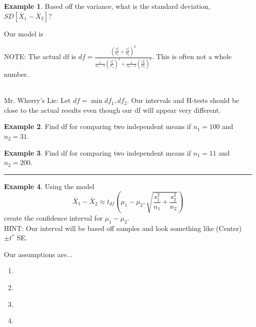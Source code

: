 \documentclass[12pt]{amsart}
\theoremstyle{definition}
\newtheorem{ex}{Example}
\begin{document}
\vspace{1.5in}

\begin{ex}Based off the variance, what is the standard deviation, $SD[\bar{X}_1-\bar{X}_2]$?
\end{ex}
\vspace{0.5in}
\begin{framed}
 Our model is
 
 \vspace{0.75in}
 
\end{framed}
\newpage
NOTE: The actual df is $\displaystyle df=\frac{\left(\frac{s_1^2}{n_1}+\frac{s_2^2}{n_2}\right)^2}{\frac{1}{n_1-1}\left(\frac{s_1^2}{n_1}\right)^2+\frac{1}{n_2-1}\left(\frac{s_2^2}{n_2}\right)^2}$. This is often not a whole number.\\
~\\
\begin{framed}
 Mr. Wherry's Lie: Let $df=\min{df_1,df_2}$. Our intervals and H-tests should be close to the actual results even though our df will appear very different. 
\end{framed}

\begin{ex} 
 Find df for comparing two independent means if $n_1=100$ and $n_2=31$.
\end{ex}

\begin{ex}
 Find df for comparing two independent means if $n_1=11$ and $n_2=200$.
\end{ex}

\vspace{0.1in}

\hrule

\vspace{0.1in}

\begin{ex}
Using the model $$\bar{X}_1-\bar{X}_2\approx t_{df}\left( \mu_1-\mu_2, \sqrt{\frac{s_1^2}{n_1}+\frac{s_2^2}{n_2}}\right)$$ create the confidence interval for $\mu_1-\mu_2$.\\
HINT: Our interval will be based off samples and look something like (Center)$\pm t^*$ SE.
\end{ex}

\vspace{0.5in}

Our assumptions are...
\begin{enumerate}
 \item \,
 \item \,
 \item \, 
 \item \,
\end{enumerate}
\end{document}
